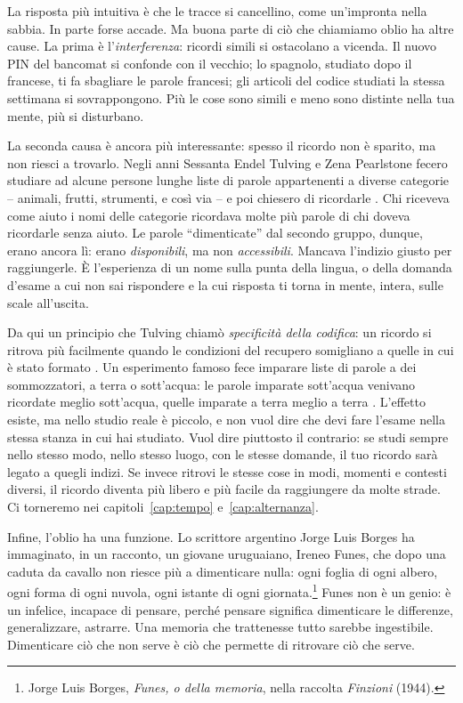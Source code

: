 La risposta più intuitiva è che le tracce si cancellino, come
un'impronta nella sabbia. In parte forse accade. Ma buona parte di ciò
che chiamiamo oblio ha altre cause. La prima è l'\emph{interferenza}:
ricordi simili si ostacolano a vicenda. Il nuovo PIN del bancomat si
confonde con il vecchio; lo spagnolo, studiato dopo il francese, ti fa
sbagliare le parole francesi; gli articoli del codice studiati la
stessa settimana si sovrappongono. Più le cose sono simili e meno sono
distinte nella tua mente, più si disturbano.

La seconda causa è ancora più interessante: spesso il ricordo non è
sparito, ma non riesci a trovarlo. Negli anni Sessanta Endel Tulving e
Zena Pearlstone fecero studiare ad alcune persone lunghe liste di
parole appartenenti a diverse categorie -- animali, frutti, strumenti,
e così via -- e poi chiesero di ricordarle \parencite{tulving1966}.
Chi riceveva come aiuto i nomi delle categorie ricordava molte più
parole di chi doveva ricordarle senza aiuto. Le parole
\enquote{dimenticate} dal secondo gruppo, dunque, erano ancora lì: erano
\emph{disponibili}, ma non \emph{accessibili}. Mancava l'indizio giusto
per raggiungerle. È l'esperienza di un nome sulla punta della lingua, o
della domanda d'esame a cui non sai rispondere e la cui risposta ti
torna in mente, intera, sulle scale all'uscita.

Da qui un principio che Tulving chiamò \emph{specificità della
codifica}: un ricordo si ritrova più facilmente quando le condizioni
del recupero somigliano a quelle in cui è stato formato
\parencite{tulving1973}. Un esperimento famoso fece imparare liste di
parole a dei sommozzatori, a terra o sott'acqua: le parole imparate
sott'acqua venivano ricordate meglio sott'acqua, quelle imparate a
terra meglio a terra \parencite{godden1975}. L'effetto esiste, ma
nello studio reale è piccolo, e non vuol dire che devi fare l'esame
nella stessa stanza in cui hai studiato. Vuol dire piuttosto il
contrario: se studi sempre nello stesso modo, nello stesso luogo, con
le stesse domande, il tuo ricordo sarà legato a quegli indizi. Se
invece ritrovi le stesse cose in modi, momenti e contesti diversi, il
ricordo diventa più libero e più facile da raggiungere da molte
strade. Ci torneremo nei capitoli~\ref{cap:tempo} e~\ref{cap:alternanza}.

Infine, l'oblio ha una funzione. Lo scrittore argentino Jorge Luis
Borges ha immaginato, in un racconto, un giovane uruguaiano, Ireneo
Funes, che dopo una caduta da cavallo non riesce più a dimenticare
nulla: ogni foglia di ogni albero, ogni forma di ogni nuvola, ogni
istante di ogni giornata.\footnote{Jorge Luis Borges,
\emph{Funes, o della memoria}, nella raccolta \emph{Finzioni} (1944).}
Funes non è un genio: è un infelice, incapace
di pensare, perché pensare significa dimenticare le differenze,
generalizzare, astrarre. Una memoria che trattenesse tutto sarebbe
ingestibile. Dimenticare ciò che non serve è ciò che permette di
ritrovare ciò che serve.

